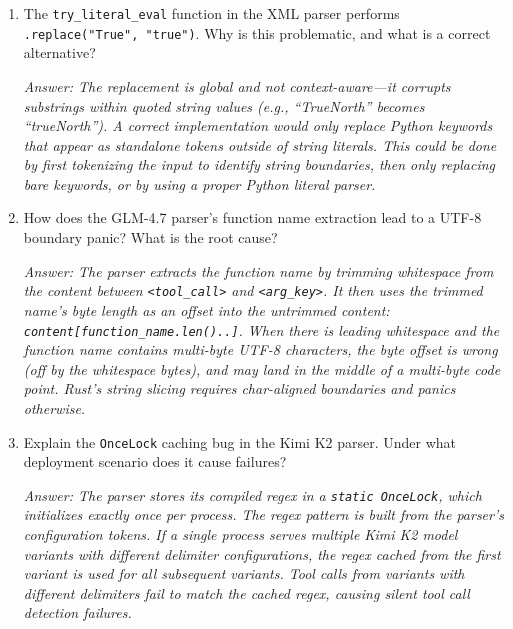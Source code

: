 \begin{enumerate}
  \emph{Answer: In batch mode, the parser sees the complete input and can use global search to find delimiters. In streaming mode, it must classify each token as it arrives---inside a tool call, outside, or at a boundary---without future context. Delimiters that span token boundaries may be detected at different points than in batch mode. A single misclassified token causes synchronization loss: the parser either buffers normal text (increasing latency) or emits tool call content as raw text (causing data corruption).}

  \item The \texttt{try\_literal\_eval} function in the XML parser performs \texttt{.replace("True", "true")}. Why is this problematic, and what is a correct alternative?

  \emph{Answer: The replacement is global and not context-aware---it corrupts substrings within quoted string values (e.g., ``TrueNorth'' becomes ``trueNorth''). A correct implementation would only replace Python keywords that appear as standalone tokens outside of string literals. This could be done by first tokenizing the input to identify string boundaries, then only replacing bare keywords, or by using a proper Python literal parser.}

  \item How does the GLM-4.7 parser's function name extraction lead to a UTF-8 boundary panic? What is the root cause?

  \emph{Answer: The parser extracts the function name by trimming whitespace from the content between \texttt{<tool\_call>} and \texttt{<arg\_key>}. It then uses the trimmed name's byte length as an offset into the untrimmed content: \texttt{content[function\_name.len()..]}. When there is leading whitespace and the function name contains multi-byte UTF-8 characters, the byte offset is wrong (off by the whitespace bytes), and may land in the middle of a multi-byte code point. Rust's string slicing requires char-aligned boundaries and panics otherwise.}

  \item Explain the \texttt{OnceLock} caching bug in the Kimi K2 parser. Under what deployment scenario does it cause failures?

  \emph{Answer: The parser stores its compiled regex in a \texttt{static OnceLock}, which initializes exactly once per process. The regex pattern is built from the parser's configuration tokens. If a single process serves multiple Kimi K2 model variants with different delimiter configurations, the regex cached from the first variant is used for all subsequent variants. Tool calls from variants with different delimiters fail to match the cached regex, causing silent tool call detection failures.}


\end{enumerate}
